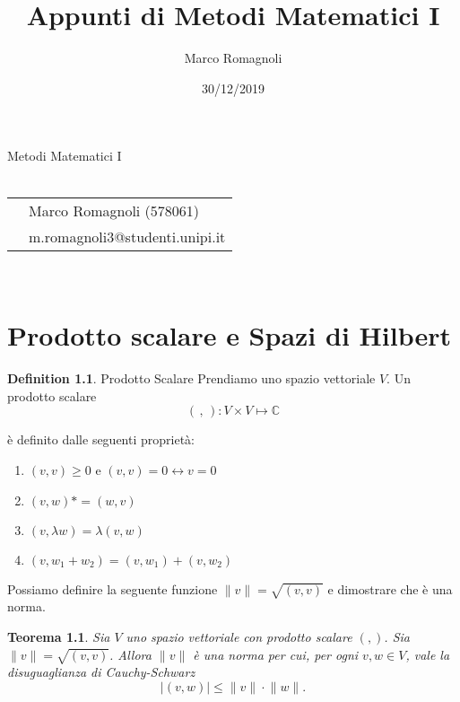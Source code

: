 \documentclass[italian,twoside,headinclude,10pt]{scrbook}
\title{Appunti di Metodi Matematici I}
\author{Marco Romagnoli}
\date{30/12/2019}
\newtheorem{theorem}{Teorema}[section]
\theoremstyle{definition}
\newtheorem{definition}{Definition}[section]
\newcommand{\abs}[1]{{\left|#1\right|}}
\newcommand{\norm}[1]{{\|#1\|}}
\begin{document}
\begin{titlepage}
	\begin{center}
		{\huge{Metodi Matematici I}}\\\vspace*{7mm}
		{\huge{\textbf{\thetitle}}}\\\vspace*{15mm}
		\begin{tabular}{ll}
		& Marco Romagnoli (578061) \\
		& m.romagnoli3@studenti.unipi.it \\
		\end{tabular}\\\vspace*{5mm}
		{\thedate}
	\end{center}
\end{titlepage}
\makeatother
\restoregeometry

\tableofcontents

\vspace{2cm}



\chapter{Prodotto scalare e Spazi di Hilbert}

\begin{definition}{Prodotto Scalare}
\label{prod_scal}
Prendiamo uno spazio vettoriale $V$. Un prodotto scalare 
\begin{equation*}
(\,,\,):V \times V \longmapsto \mathbb{C}
\end{equation*}  

è definito dalle seguenti proprietà:
\begin{enumerate}
\item $(v,v) \geq 0$ e $(v,v) = 0 \leftrightarrow v = 0$
\item $(v,w)*=(w,v)$
\item $(v,\lambda w) = \lambda(v,w)$
\item $(v,w_1+w_2) = (v,w_1) + (v,w_2)$
\end{enumerate} 

\end{definition}

Possiamo definire la seguente funzione $\norm{v}  = \sqrt{(v,v)}$ e dimostrare che è una norma.

\begin{theorem}
Sia $V$ uno spazio vettoriale con prodotto scalare $(,)$. Sia $\norm{v} = \sqrt{(v,v)}$. Allora $\norm{v}$ è una norma per cui, per ogni $v,w \in V$, vale la disuguaglianza di Cauchy-Schwarz 
\begin{equation}
\label{dis_sch}
\abs{(v,w)} \leq \norm{v} \cdot \norm{w}.
\end{equation} 
\end{theorem}
\end{document}
